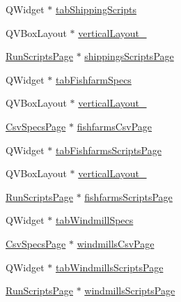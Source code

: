 \begin{DoxyCompactItemize}
\item 
Q\+Widget $\ast$ \mbox{\hyperlink{class_ui___vessel_editor_main_window_a7dc02c655defc73834c09abff105b092}{tab\+Shipping\+Scripts}}
\item 
Q\+V\+Box\+Layout $\ast$ \mbox{\hyperlink{class_ui___vessel_editor_main_window_a62636e5c5bc02c56d3603cb8f4fe6249}{vertical\+Layout\+\_}}
\item 
\mbox{\hyperlink{class_run_scripts_page}{Run\+Scripts\+Page}} $\ast$ \mbox{\hyperlink{class_ui___vessel_editor_main_window_a4c4143a08e0acaa0188958f3b869b754}{shippings\+Scripts\+Page}}
\item 
Q\+Widget $\ast$ \mbox{\hyperlink{class_ui___vessel_editor_main_window_a9a831f664f6aeef0de7d2ebcbc3ce39c}{tab\+Fishfarm\+Specs}}
\item 
Q\+V\+Box\+Layout $\ast$ \mbox{\hyperlink{class_ui___vessel_editor_main_window_aba936ca91e17c0904a42bbbc387e4af3}{vertical\+Layout\+\_}}
\item 
\mbox{\hyperlink{class_csv_specs_page}{Csv\+Specs\+Page}} $\ast$ \mbox{\hyperlink{class_ui___vessel_editor_main_window_a3589c8f93f88d4cb0acba7ac4826bc9d}{fishfarms\+Csv\+Page}}
\item 
Q\+Widget $\ast$ \mbox{\hyperlink{class_ui___vessel_editor_main_window_adaa3112ffc91f416a8633dd7d38acfe4}{tab\+Fishfarms\+Scripts\+Page}}
\item 
Q\+V\+Box\+Layout $\ast$ \mbox{\hyperlink{class_ui___vessel_editor_main_window_a66f8cb7301dcdf93a3bb53bf63d8f258}{vertical\+Layout\+\_}}
\item 
\mbox{\hyperlink{class_run_scripts_page}{Run\+Scripts\+Page}} $\ast$ \mbox{\hyperlink{class_ui___vessel_editor_main_window_a32f20e551f2ccb60147264a14ee21e73}{fishfarms\+Scripts\+Page}}
\item 
Q\+Widget $\ast$ \mbox{\hyperlink{class_ui___vessel_editor_main_window_a06359e7273d3f8d8166457e92eb00266}{tab\+Windmill\+Specs}}
\item 
\mbox{\hyperlink{class_csv_specs_page}{Csv\+Specs\+Page}} $\ast$ \mbox{\hyperlink{class_ui___vessel_editor_main_window_a24d095867c9dee993b311fb45e045430}{windmills\+Csv\+Page}}
\item 
Q\+Widget $\ast$ \mbox{\hyperlink{class_ui___vessel_editor_main_window_a15533cbf67290bda1d2014894029539d}{tab\+Windmills\+Scripts\+Page}}
\item 
\mbox{\hyperlink{class_run_scripts_page}{Run\+Scripts\+Page}} $\ast$ \mbox{\hyperlink{class_ui___vessel_editor_main_window_aed9bf86859c6c6f27f2833edc4843f98}{windmills\+Scripts\+Page}}

\end{DoxyCompactItemize}
